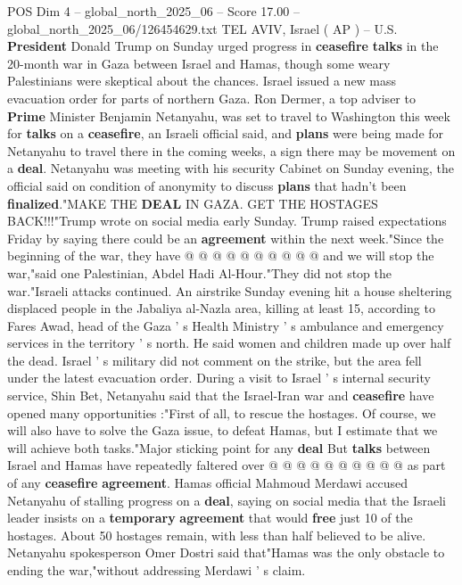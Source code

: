 \begin{textsample}{POS Dim 4 – global\_north\_2025\_06 – Score 17.00 – global\_north\_2025\_06/126454629.txt}  \label{ex:f4_pos_385}
TEL AVIV, Israel ( AP ) -- U.S. \textbf{President} Donald Trump on Sunday urged progress in \textbf{ceasefire} \textbf{talks} in the 20-month war in Gaza between Israel and Hamas, though some weary Palestinians were skeptical about the chances.
Israel issued a new mass evacuation order for parts of northern Gaza.
Ron Dermer, a top adviser to \textbf{Prime} Minister Benjamin Netanyahu, was set to travel to Washington this week for \textbf{talks} on a \textbf{ceasefire}, an Israeli official said, and \textbf{plans} were being made for Netanyahu to travel there in the coming weeks, a sign there may be movement on a \textbf{deal}.
Netanyahu was meeting with his security Cabinet on Sunday evening, the official said on condition of anonymity to discuss \textbf{plans} that hadn't been \textbf{finalized}."MAKE THE \textbf{DEAL} IN GAZA.
GET THE HOSTAGES BACK!!!"Trump wrote on social media early Sunday.
Trump raised expectations Friday by saying there could be an \textbf{agreement} within the next week."Since the beginning of the war, they have @ @ @ @ @ @ @ @ @ @ and we will stop the war,"said one Palestinian, Abdel Hadi Al-Hour."They did not stop the war."Israeli attacks continued.
An airstrike Sunday evening hit a house sheltering displaced people in the Jabaliya al-Nazla area, killing at least 15, according to Fares Awad, head of the Gaza ' s Health Ministry ' s ambulance and emergency services in the territory ' s north.
He said women and children made up over half the dead.
Israel ' s military did not comment on the strike, but the area fell under the latest evacuation order.
During a visit to Israel ' s internal security service, Shin Bet, Netanyahu said that the Israel-Iran war and \textbf{ceasefire} have opened many opportunities :"First of all, to rescue the hostages.
Of course, we will also have to solve the Gaza issue, to defeat Hamas, but I estimate that we will achieve both tasks."Major sticking point for any \textbf{deal} But \textbf{talks} between Israel and Hamas have repeatedly faltered over @ @ @ @ @ @ @ @ @ @ as part of any \textbf{ceasefire} \textbf{agreement}.
Hamas official Mahmoud Merdawi accused Netanyahu of stalling progress on a \textbf{deal}, saying on social media that the Israeli leader insists on a \textbf{temporary} \textbf{agreement} that would \textbf{free} just 10 of the hostages.
About 50 hostages remain, with less than half believed to be alive.
Netanyahu spokesperson Omer Dostri said that"Hamas was the only obstacle to ending the war,"without addressing Merdawi ' s claim.

\end{textsample}
